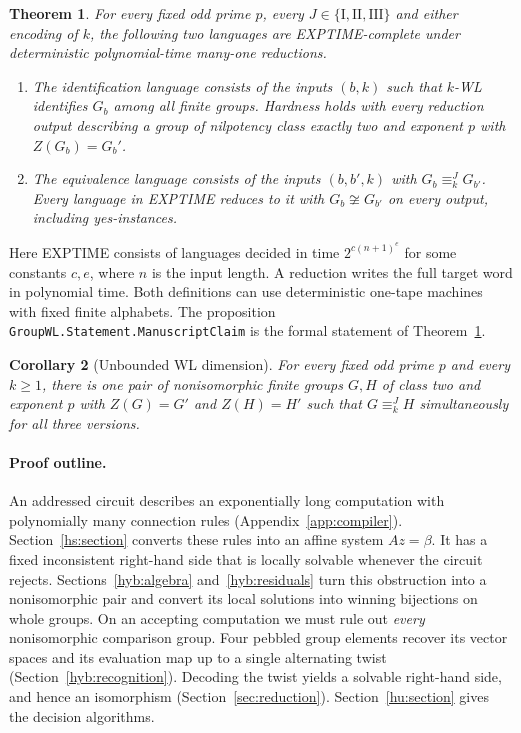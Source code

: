\documentclass[11pt]{article}
\newtheorem{theorem}{Theorem}[section]
\newtheorem{corollary}[theorem]{Corollary}
\theoremstyle{definition}
\theoremstyle{remark}
\numberwithin{equation}{section}
\begin{document}
\begin{theorem}\label{thm:main}
For every fixed odd prime $p$, every $J\in\{\mathrm I,\mathrm{II},\mathrm{III}\}$
and either encoding of $k$, the following two languages are EXPTIME-complete
under deterministic polynomial-time many-one reductions.
\begin{enumerate}[label=\textup{(\roman*)}]
\item The identification language consists of the inputs $(b,k)$ such
that $k$-WL identifies $G_b$ among all finite groups. Hardness holds
with every reduction output describing a group of nilpotency class
exactly two and exponent $p$ with $Z(G_b)=G_b'$.
\item The equivalence language consists of the inputs $(b,b',k)$ with
$G_b\equiv_k^J G_{b'}$. Every language in EXPTIME reduces to it with
$G_b\not\cong G_{b'}$ on every output, including yes-instances.
\end{enumerate}
\end{theorem}
Here EXPTIME consists of languages decided in time $2^{c(n+1)^e}$ for some constants $c,e$, where $n$ is the input length. A reduction writes the full target
word in polynomial time. Both definitions can use deterministic one-tape
machines with fixed finite alphabets. The proposition
\texttt{GroupWL.Statement.ManuscriptClaim} is the formal statement of
Theorem~\ref{thm:main}.

\begin{corollary}[Unbounded WL dimension]\label{cor:unbounded}
For every fixed odd prime $p$ and every $k\ge1$, there is one pair of
nonisomorphic finite groups $G,H$ of class two and exponent $p$ with
$Z(G)=G'$ and $Z(H)=H'$ such that $G\equiv_k^J H$ simultaneously for
all three versions.
\end{corollary}

\paragraph{Proof outline.}
An addressed circuit describes an exponentially long computation with
polynomially many connection rules (Appendix~\ref{app:compiler}).
Section~\ref{hs:section} converts these rules into an affine system
$Az=\beta$. It has a fixed inconsistent right-hand side that is locally
solvable whenever the circuit rejects. Sections~\ref{hyb:algebra}
and~\ref{hyb:residuals} turn this obstruction into a nonisomorphic pair
and convert its local solutions into winning bijections on whole groups.
On an accepting computation we must rule out \emph{every} nonisomorphic
comparison group. Four pebbled group elements recover its vector spaces
and its evaluation map up to a single alternating twist
(Section~\ref{hyb:recognition}). Decoding the twist yields a solvable
right-hand side, and hence an isomorphism (Section~\ref{sec:reduction}).
Section~\ref{hu:section} gives the decision algorithms.
\end{document}

